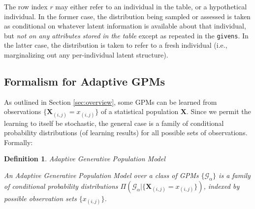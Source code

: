 \documentclass[10pt,letterpaper]{article}
\newtheorem{definition}{Definition}[section]
\newcommand{\set}[1]{\{#1\}}
\newcommand{\G}{\mathcal{G}}
\begin{document}
The row index $r$ may either refer to an individual in the
table, or a hypothetical individual.  In the former case, the
distribution being sampled or assessed is taken as conditional on
whatever latent information is available about that individual, but
\textit{not on any attributes stored in the table} except as repeated in
the \texttt{givens}.  In the latter case, the distribution is taken to
refer to a fresh individual (i.e., marginalizing out any
per-individual latent structure).

\subsection{Formalism for Adaptive GPMs}
\label{sec:formalism-adaptive-gpm}

As outlined in Section \ref{sec:overview}, some GPMs can be learned
from observations $\set{\mathbf{X}_{(i,j)} = x_{(i,j)}}$ of a statistical 
population $\mathbf{X}$.  Since we permit the learning to itself be stochastic,
the general case is a family of conditional probability distributions
(of learning results) for all possible sets of observations.  Formally:

\begin{definition} Adaptive Generative Population Model

An \emph{Adaptive Generative Population Model} over a class of GPMs
$\{\G_\alpha\}$ is a family of conditional probability distributions
$\Pi(\G_\alpha|\{\mathbf{X}_{(i,j)} = x_{(i,j)}\})$, indexed by possible
observation sets $\{x_{(i,j)}\}$.
\end{definition}
\end{document}
